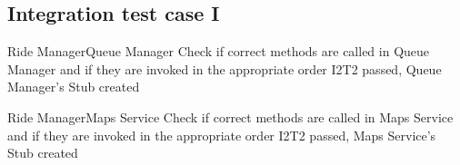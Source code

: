
\subsection{Integration test case I}
\setcounter{testcounter}{1}
{Ride Manager\textrightarrow Queue Manager}
{
}
{}
{Check if correct methods are called in Queue Manager and if they are invoked in the appropriate order}
{I2T2 passed, Queue Manager's Stub created}

\vspace{2ex}
{Ride Manager\textrightarrow Maps Service}
{
}
{}
{Check if correct methods are called in Maps Service and if they are invoked in the appropriate order}
{I2T2 passed, Maps Service's Stub created}